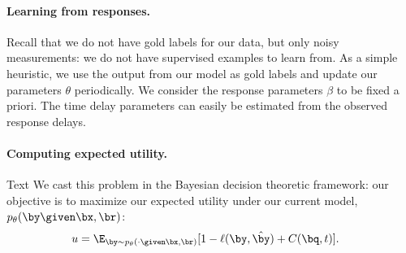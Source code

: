 \paragraph{Learning from responses.}
Recall that we do not have gold labels for our data, but only noisy measurements: we do not have supervised examples to learn from. 
As a simple heuristic, we use the output from our model as gold labels and update our parameters $\theta$ periodically.  
We consider the response parameters $\beta$ to be fixed a priori.
The time delay parameters can easily be estimated from the observed response delays.

\paragraph{Computing expected utility.}

\ac{Text}
We cast this problem in the Bayesian decision theoretic framework: our objective is to maximize our expected utility under our current model,
$\p(\by \given \bx, \br)$:
\begin{align*}
  u &= \E_{\by \sim \p(\cdot \given \bx, \br)}[1 - \ell(\by, \byt) + C(\bq, t)].
\end{align*}

